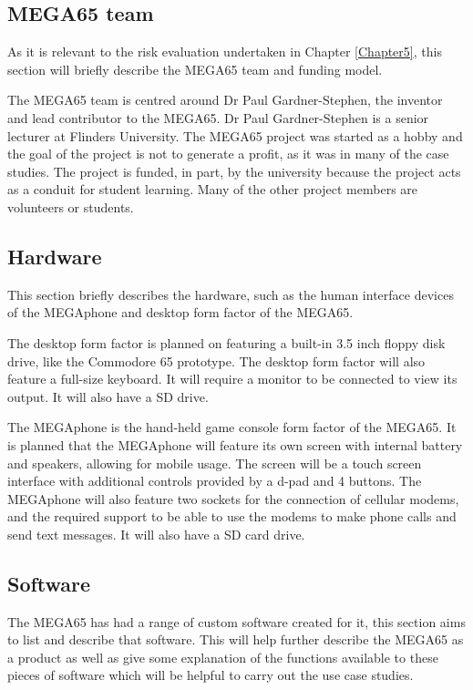 \subsection{MEGA65 team}
As it is relevant to the risk evaluation undertaken in Chapter \ref{Chapter5}, this section will briefly describe the MEGA65 team and funding model. 

The MEGA65 team is centred around Dr Paul Gardner-Stephen, the inventor and lead contributor to the MEGA65. Dr Paul Gardner-Stephen is a senior lecturer at Flinders University. The MEGA65 project was started as a hobby and the goal of the project is not to generate a profit, as it was in many of the case studies. The project is funded, in part, by the university because the project acts as a conduit for student learning. Many of the other project members are volunteers or students.

\subsection{Hardware}
This section briefly describes the hardware, such as the human interface devices of the MEGAphone and desktop form factor of the MEGA65. 

The desktop form factor is planned on featuring a built-in 3.5 inch floppy disk drive, like the Commodore 65 prototype. The desktop form factor will also feature a full-size keyboard. It will require a monitor to be connected to view its output. It will also have a SD drive.

The MEGAphone is the hand-held game console form factor of the MEGA65. It is planned that the MEGAphone will feature its own screen with internal battery and speakers, allowing for mobile usage. The screen will be a touch screen interface with additional controls provided by a d-pad and 4 buttons. The MEGAphone will also feature two sockets for the connection of cellular modems, and the required support to be able to use the modems to make phone calls and send text messages. It will also have a SD card drive.  

\subsection{Software}
\label{Software}
The MEGA65 has had a range of custom software created for it, this section aims to list and describe that software. This will help further describe the MEGA65 as a product as well as give some explanation of the functions available to these pieces of software which will be helpful to carry out the use case studies.\\

